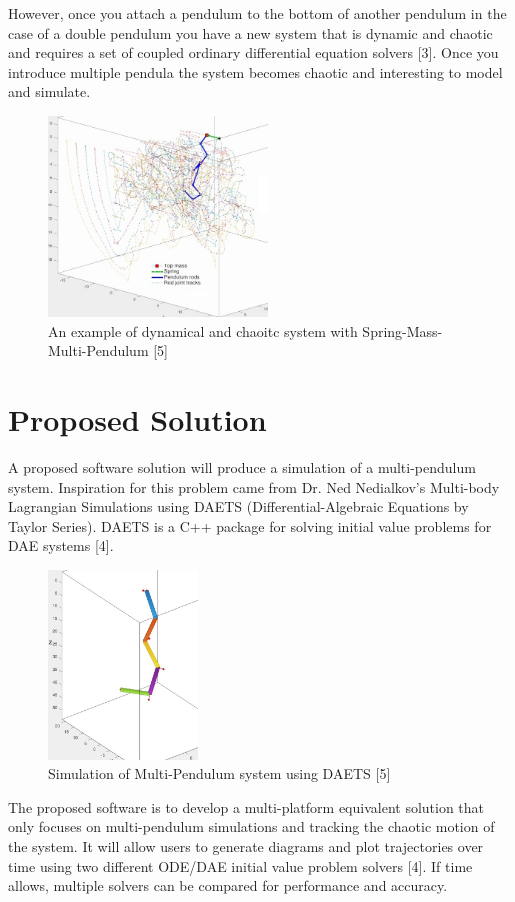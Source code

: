 \documentclass{article}
\begin{document}
However, once you attach a pendulum to the bottom of another pendulum in the case of a double pendulum you have a new system that is dynamic and chaotic and requires a set of coupled ordinary differential equation solvers [3]. Once you introduce multiple pendula the system becomes chaotic and interesting to model and simulate.

\begin{figure}[H]
	\centering
	\includegraphics[width=220px]{multi-pend.jpg}
	\caption{An example of dynamical and chaoitc system with Spring-Mass-Multi-Pendulum [5]}
	\label{fig:maxresdefault}
\end{figure}

\section*{Proposed Solution}
A proposed software solution will produce a simulation of a multi-pendulum system. Inspiration for this problem came from Dr. Ned Nedialkov's Multi-body Lagrangian Simulations using DAETS (Differential-Algebraic Equations by Taylor Series). DAETS is a C++ package for solving initial value problems for DAE systems [4].

\begin{figure}[H]
	\centering
	\includegraphics[width=150px]{3pend.jpg}
	\caption{Simulation of Multi-Pendulum system using DAETS [5]}
	\label{fig:maxresdefault}
\end{figure}

The proposed software is to develop a multi-platform equivalent solution that
only focuses on multi-pendulum simulations and tracking the chaotic motion of
the system. It will allow users to generate diagrams and plot trajectories over
time using two different ODE/DAE initial value problem solvers [4]. If time
allows, multiple solvers can be compared for performance and
accuracy. 
\end{document}
